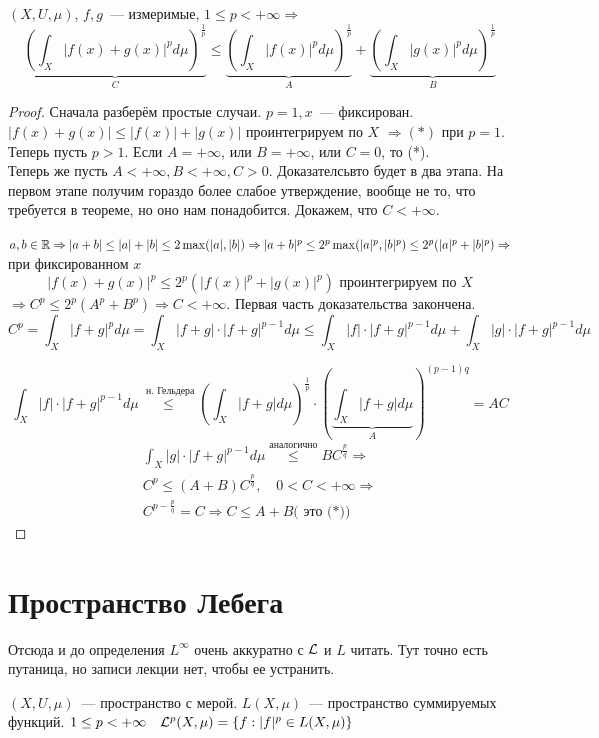 \documentclass[document]{subfiles}
\begin{document}
\begin{theorem}
    $(X, U, \mu)$, $f, g$~--- измеримые, $1 \leq p < + \infty \Rightarrow$
    \[ \underbrace{\left( \int_X |f(x) + g(x)|^p d \mu \right)^{\frac{1}{p}}}_{C}  \leq \underbrace{\left( \int_X |f(x)|^p d \mu \right)^{\frac{1}{p}}}_{A} + 
    \underbrace{\left( \int_X |g(x)|^p d \mu \right)^{\frac{1}{p}}}_{B} \tag{*} \]
    
\end{theorem}
\begin{proof}
    Сначала разберём простые случаи. $p = 1, x$~--- фиксирован. $|f(x) + g(x)| \leq |f(x)| + |g(x)|$ проинтегрируем по $X$ $\Rightarrow (*)$ при $p = 1$.
    Теперь пусть $p > 1$. Если $A = +\infty$, или $B = +\infty$, или $C = 0$, то (*). \\
    Теперь же пусть $A < +\infty, B < +\infty, C > 0$. 
    Доказателсьвто будет в два этапа. На первом этапе получим гораздо более слабое утверждение, вообще не то, что требуется в теореме, но оно нам понадобится.
    Докажем, что $C < + \infty$.
    
    $a,b \in \mathbb{R} \Rightarrow |a+b| \leq |a| + |b| \leq 2 \max(|a|, |b|) \Rightarrow |a+b|^p \leq 2^p \max(|a|^p, |b|^p) \leq 2^p(|a|^p + |b|^p) \Rightarrow$
    при фиксированном $x$ 
    \[ |f(x) + g(x) |^p \leq 2^p (|f(x)|^p + |g(x)|^p) \text{ проинтегрируем по } X \]
    $\Rightarrow C^p \leq 2^p(A^p + B^p) \Rightarrow C < + \infty$.
    Первая часть доказательства закончена. \\
    \[ C^p = \int_X |f+g|^p d \mu = \int_X |f+g| \cdot |f + g|^{p-1} d \mu \leq \int_X |f| \cdot |f+g|^{p-1} d\mu + \int_X |g| \cdot |f+g|^{p-1} d \mu \]

    \[ \int_X |f| \cdot |f+g|^{p-1} d\mu \stackrel{\text{ н. Гельдера}}{\leq} \left( \int_X |f+g| d\mu \right)^{\frac{1}{p}} \cdot \left( \underbrace{\int_X |f+g| d\mu}_{A} \right)^{(p-1)q} %
    = AC \]
    \begin{gather*}
        \int_X |g| \cdot |f+g|^{p-1} d \mu \stackrel{\text{аналогично}}{\leq} BC^{\frac{p}{q}} \Rightarrow \\
        C^p \leq (A+B) C^{\frac{p}{q}}, \quad 0 < C < + \infty \Rightarrow \\
        C^{p - \frac{p}{q}} = C \Rightarrow C \leq A + B \text{( это (*))}
    \end{gather*}
\end{proof}

\section{Пространство Лебега}
Отсюда и до определения $L^\infty$ очень аккуратно с $\mathcal{L}$ и $L$ читать. Тут точно есть путаница, но записи лекции нет, чтобы ее устранить.
\begin{definition}
    $(X, U, \mu)$~--- пространство с мерой. $L(X, \mu)$~--- пространство суммируемых функций. $1 \leq p < +\infty \quad \mathcal{L}^p(X, \mu) = \{ f: |f|^p \in L(X,\mu) \}$ 
\end{definition}
\end{document}
